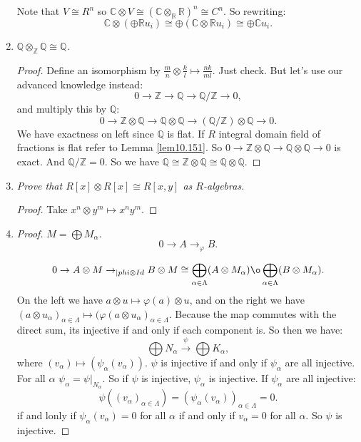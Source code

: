 \documentclass[12pt]{amsbook}
\theoremstyle{plain}
\numberwithin{section}{chapter}
\numberwithin{equation}{chapter}
\theoremstyle{definition}
\theoremstyle{remark}
\newcommand{\R}{\mathbb{R}}
\newcommand{\z}{\mathbb{Z}}
\newcommand{\Q}{\mathbb{Q}}
\renewcommand{\c}{\mathbb{C}}
\newcommand{\fracc}{\frac}
\newcommand{\tens}{\otimes}
\renewcommand{\phi}{\varphi}
\begin{document}
\begin{enumerate}[label=\arabic*.]
Note that $V \cong R^n$ so $\c \tens V \cong (\c \tens_\R \R)^n \cong C^n$. So rewriting:
$$
\c \tens(\oplus\R u_i) \cong \oplus(\c \tens \R u_i) \cong \oplus \c u_i.
$$



\setcounter{enumi}{13}
\item \textit{$\Q \tens_\z \Q \cong \Q$. }

\begin{proof}
Define an isomorphism by $\fracc{m}{n} \tens \fracc{k}{l} \mapsto \fracc{nk}{ml}$. Just check. But let's use our advanced knowledge instead:
$$
0 \to \z \to \Q \to \Q/\z \to 0,
$$
and multiply this by $\Q$:
$$
0 \to \z \tens \Q \to \Q \tens \Q \to (\Q/\z)\tens \Q \to 0.
$$
We have exactness on left since $\Q$ is flat. If $R$ integral domain field of fractions is flat refer to Lemma \ref{lem10.151}. So $0 \to \z \tens \Q \to \Q \tens \Q \to 0$ is exact. And $\Q/\z = 0$. So we have $\Q \cong \z \tens \Q \cong \Q \tens \Q$. 
\end{proof}

\setcounter{enumi}{15}

\item \textit{Prove that $R[x] \tens R[x] \cong R[x,y]$ as $R$-algebras. }

\begin{proof}
Take $x^n \tens y^m \mapsto x^ny^m$. 
\end{proof}

\setcounter{enumi}{18}

 \item 

\begin{proof}
$M = \bigoplus M_\alpha$. 
$$
0 \to A \to_\phi B.
$$

$$
0 \to A \tens M \to_{|phi \tens Id} B \tens M \cong \bigoplus_{\alpha \in \Lambda}(A \tens M_\alpha) \o \bigoplus_{\alpha \in \Lambda}(B \tens M_\alpha).
$$
On the left we have $a \tens u \mapsto \phi(a) \tens u$, and on the right we have $(a \tens u_\alpha)_{\alpha \in \Lambda} \mapsto(\phi(a \tens u_\alpha)_{\alpha \in \Lambda}$. Because the map commutes with the direct sum, its injective if and only if each component is. So then we have:
$$
\bigoplus N_\alpha \overset{\psi}{\to} \bigoplus K_\alpha,
$$
where $(v_\alpha) \mapsto(\psi_\alpha(v_\alpha))$. $\psi$ is injective if and only if $\psi_\alpha$ are all injective. For all $\alpha$ $\psi_\alpha = \psi|_{N_\alpha}$. So if $\psi$ is injective, $\psi_\alpha$ is injective. If $\psi_\alpha$ are all injective:
$$
\psi((v_\alpha)_{\alpha \in \Lambda}) = (\psi_\alpha(v_\alpha))_{\alpha \in \Lambda} = 0.
$$
if and lonly if $\psi_\alpha(v_\alpha) = 0$ for all $\alpha$ if and only if $v_\alpha = 0$ for all $\alpha$. So $\psi$ is injective. 
\end{proof}



\end{enumerate}
\end{document}
